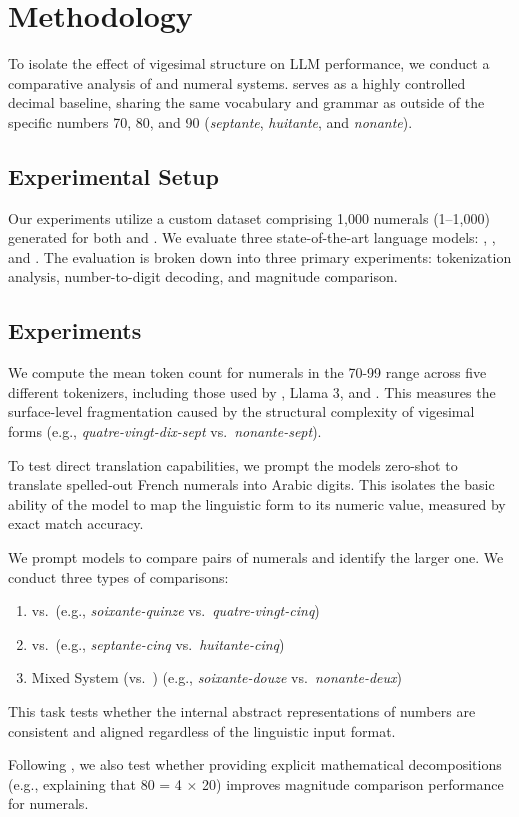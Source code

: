 \section{Methodology}

To isolate the effect of vigesimal structure on LLM performance, we conduct a comparative analysis of \standardfrench and \swissfrench numeral systems. \swissfrench serves as a highly controlled decimal baseline, sharing the same vocabulary and grammar as \standardfrench outside of the specific numbers 70, 80, and 90 (\textit{septante}, \textit{huitante}, and \textit{nonante}).

\subsection{Experimental Setup}
Our experiments utilize a custom dataset comprising 1,000 numerals (1--1,000) generated for both \standardfrench and \swissfrench. We evaluate three state-of-the-art language models: \gpt, \claude, and \llama. The evaluation is broken down into three primary experiments: tokenization analysis, number-to-digit decoding, and magnitude comparison.

\subsection{Experiments}

We compute the mean token count for numerals in the 70-99 range across five different tokenizers, including those used by \gpt, Llama 3, and \mistral. This measures the surface-level fragmentation caused by the structural complexity of vigesimal forms (e.g., \textit{quatre-vingt-dix-sept} vs.\ \textit{nonante-sept}). 

To test direct translation capabilities, we prompt the models zero-shot to translate spelled-out French numerals into Arabic digits. This isolates the basic ability of the model to map the linguistic form to its numeric value, measured by exact match accuracy.

We prompt models to compare pairs of numerals and identify the larger one. We conduct three types of comparisons:
\begin{enumerate}[leftmargin=*,itemsep=0pt,topsep=0pt]
    \item \standardfrench vs.\ \standardfrench (e.g., \textit{soixante-quinze} vs.\ \textit{quatre-vingt-cinq})
    \item \swissfrench vs.\ \swissfrench (e.g., \textit{septante-cinq} vs.\ \textit{huitante-cinq})
    \item Mixed System (\standardfrench vs.\ \swissfrench) (e.g., \textit{soixante-douze} vs.\ \textit{nonante-deux})
\end{enumerate}
This task tests whether the internal abstract representations of numbers are consistent and aligned regardless of the linguistic input format.

Following \citet{bhattacharya2025investigating}, we also test whether providing explicit mathematical decompositions (e.g., explaining that 80 = 4 $\times$ 20) improves magnitude comparison performance for \standardfrench numerals.